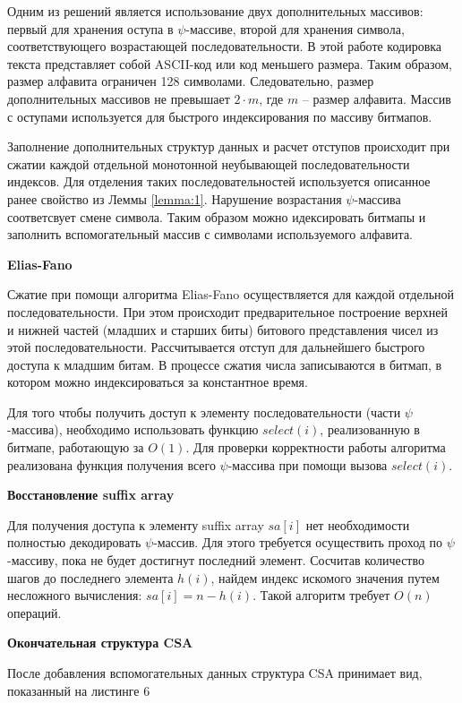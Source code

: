 Одним из решений является использование двух дополнительных массивов:
первый для хранения оступа в $\psi$-массиве, второй для хранения символа,
соответствующего возрастающей последовательности.
В этой работе кодировка текста представляет собой ASCII-код или код меньшего размера.
Таким образом, размер алфавита ограничен 128 символами. Следовательно, размер
дополнительных массивов не превышает $2 \cdot m$, где $m$ -- размер алфавита.
Массив с оступами используется для быстрого индексирования по массиву битмапов.

Заполнение дополнительных структур данных и расчет отступов происходит при сжатии каждой отдельной
монотонной неубывающей последовательности индексов.
Для отделения таких последовательностей используется описанное ранее свойство из Леммы \ref{lemma:1}.
Нарушение возрастания $\psi$-массива соответсвует смене символа. Таким образом можно идексировать
битмапы и заполнить вспомогательный массив с символами используемого алфавита.

\textbf{Elias-Fano}

Сжатие при помощи алгоритма Elias-Fano осуществляется для каждой отдельной последовательности.
При этом происходит предварительное построение верхней и нижней частей (младших и старших биты)
битового представления чисел из этой последовательности. Рассчитывается отступ для дальнейшего
быстрого доступа к младшим битам. В процессе сжатия числа записываются в битмап,
в котором можно индексироваться за константное время.

Для того чтобы получить доступ к элементу последовательности (части $\psi$-массива),
необходимо использовать функцию $select(i)$, реализованную в битмапе, работающую за $O(1)$.
Для проверки корректности работы алгоритма реализована функция получения всего $\psi$-массива
при помощи вызова $select(i)$.

\textbf{Восстановление suffix array}

Для получения доступа к элементу suffix array $sa[i]$ нет необходимости полностью декодировать
$\psi$-массив. Для этого требуется осуществить проход по $\psi$-массиву, пока не будет достигнут
последний элемент. Сосчитав количество шагов до последнего элемента $h(i)$, найдем индекс искомого
значения путем несложного вычисления: $sa[i] = n - h(i)$. Такой алгоритм требует $O(n)$ операций.

\textbf{Окончательная структура CSA}

После добавления вспомогательных данных структура CSA принимает вид, показанный на листинге 6

